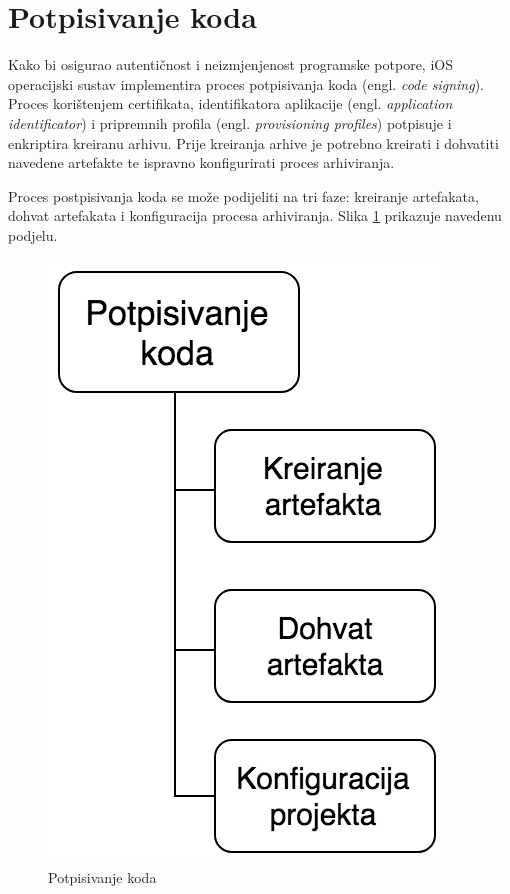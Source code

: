 \documentclass[times, utf8, diplomski, numeric]{fer}
\newcommand{\eng}[1]{(engl. \textit{#1})}
\begin{document}
\section{Potpisivanje koda} \label{header:PotpisivanjeKoda}

Kako bi osigurao autentičnost i neizmjenjenost programske potpore, iOS operacijski sustav implementira proces potpisivanja koda \eng{code signing}. Proces korištenjem certifikata, identifikatora aplikacije \eng{application identificator} i pripremnih profila \eng{provisioning profiles} potpisuje i enkriptira kreiranu arhivu. Prije kreiranja arhive je potrebno kreirati i dohvatiti navedene artefakte te ispravno konfigurirati proces arhiviranja.

Proces postpisivanja koda se može podijeliti na tri faze: kreiranje artefakata, dohvat artefakata i konfiguracija procesa arhiviranja. Slika \ref{fig:CodeSigning} prikazuje navedenu podjelu.

\begin{figure}
\centering
\includegraphics[scale=0.6]{CodeSigning}
\caption{Potpisivanje koda}
\label{fig:CodeSigning}
\end{figure}
\end{document}
